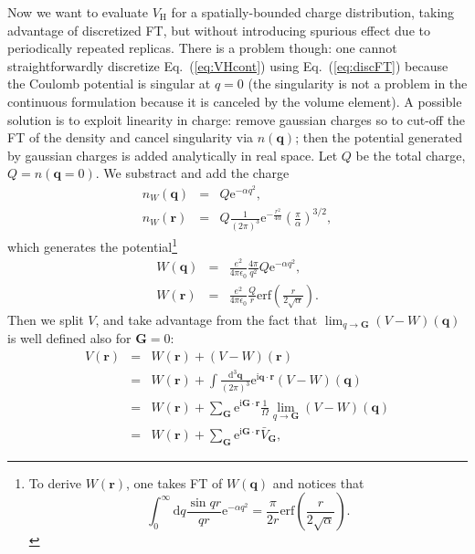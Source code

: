 \documentclass[a4paper,twocolumn,12pt]{article}
\begin{document}
Now we want to evaluate $V_\text{H}$ for a spatially-bounded charge
distribution, taking advantage of discretized FT, but without
introducing spurious effect due to periodically repeated replicas.
There is a problem though: one cannot straightforwardly
discretize Eq.~(\ref{eq:VHcont}) using Eq.~(\ref{eq:discFT}) because
the Coulomb potential is singular at $q=0$ (the singularity is
not a problem in the continuous formulation because it is canceled by
the volume element).  A possible solution is to exploit linearity in
charge: remove gaussian charges so to cut-off the FT of the density
and cancel singularity via $n(\mathbf{q})$; then the potential
generated by gaussian charges is added analytically in real space.
Let $Q$ be the total charge, $Q=n(\mathbf{q}=0)$.  We substract and
add the charge
\begin{eqnarray}
n_W(\mathbf{q})&=&Q\mathrm{e}^{-\alpha q^2}, \\
n_W(\mathbf{r})&=&Q \frac{1}{(2\pi)^3} \mathrm{e}^{-\frac{r^2}{4\alpha}}\left(\frac{\pi}{\alpha}\right)^{3/2},
\end{eqnarray}
which generates the potential\footnote{To derive $W(\mathbf{r})$, one
takes FT of $W(\mathbf{q})$ and notices that $$\int_0^\infty
\mathrm{d}q \frac{\sin{qr}}{qr}\mathrm{e}^{-\alpha q^2}
=\frac{\pi}{2r}\text{erf}\left(\frac{r}{2\sqrt{\alpha}}\right).$$}
\begin{eqnarray}
W(\mathbf{q})&=&\frac{e^2}{4\pi\epsilon_0}\frac{4\pi}{q^2}Q\mathrm{e}^{-\alpha q^2},\\
W(\mathbf{r})&=&\frac{e^2}{4\pi\epsilon_0}\frac{Q}{r}\text{erf}\left(\frac{r}{2\sqrt{\alpha}}\right).
\end{eqnarray}
Then we split $V$, and take advantage from the fact that
$\lim_{q\rightarrow\mathbf{G}}(V-W)(\mathbf{q})$ is well defined also
for $\mathbf{G}=0$:
\begin{eqnarray}
V(\mathbf{r})&=&W(\mathbf{r})+(V-W)(\mathbf{r})\\
&=&W(\mathbf{r}) + \int \frac{\mathrm{d}^3\mathbf{q}}{(2\pi)^3} \mathrm{e}^{ \mathrm{i} \mathbf{q} \cdot \mathbf{r}}(V-W)(\mathbf{q})\nonumber\\
&=&W(\mathbf{r}) + \sum_\mathbf{G} \mathrm{e}^{\mathrm{i}\mathbf{G}\cdot\mathbf{r}}\frac{1}{\Omega}\lim_{q\rightarrow\mathbf{G}}(V-W)(\mathbf{q})\nonumber\\
&=&W(\mathbf{r}) + \sum_\mathbf{G} \mathrm{e}^{\mathrm{i}\mathbf{G}\cdot\mathbf{r}} \bar{V}_\mathbf{G},
\end{eqnarray}
\end{document}
